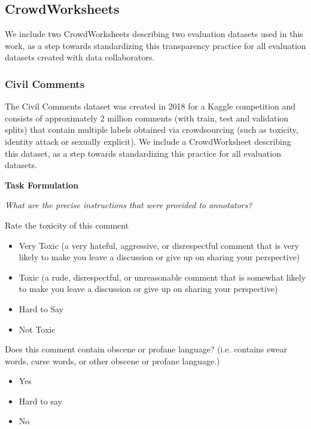\newenvironment{itemizepacked}
{ \begin{itemize}
    \setlength{\itemsep}{0pt}
    \setlength{\parskip}{0pt}
    \setlength{\parsep}{0pt}     }
{ \end{itemize}                  } 

\pagebreak
\subsection{CrowdWorksheets}
We include two CrowdWorksheets \citep{Diaz2022-mz} describing two evaluation datasets used in this work, as a step towards standardizing this transparency practice for all evaluation datasets created with data collaborators.

\subsubsection{Civil Comments}
\label{app-crowdworksheet-civil-comments}
The Civil Comments dataset \citep{civilcomments} was created in 2018 for a Kaggle competition \citep{civil-comments-kaggle-competition} and consists of approximately 2 million comments (with train, test and validation splits) that contain multiple labels obtained via crowdsourcing (such as toxicity, identity attack or sexually explicit).  We include a CrowdWorksheet \citep{Diaz2022-mz} describing this dataset, as a step towards standardizing this practice for all evaluation datasets.

\textbf{Task Formulation}

\textit{What are the precise instructions that were provided to annotators?}

Rate the toxicity of this comment

\begin{itemizepacked}
    \item Very Toxic (a very hateful, aggressive, or disrespectful comment that is very likely to make you leave a discussion or give up on sharing your perspective)
    \item Toxic (a rude, disrespectful, or unreasonable comment that is somewhat likely to make you leave a discussion or give up on sharing your perspective)
    \item Hard to Say
    \item Not Toxic
\end{itemizepacked}

Does this comment contain obscene or profane language?
(i.e. contains swear words, curse words, or other obscene or profane language.)
\begin{itemizepacked}
  \item Yes
  \item Hard to say
  \item No
\end{itemizepacked}

